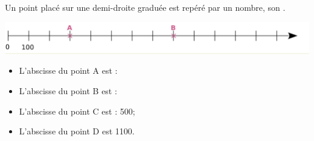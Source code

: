 \documentclass[xcolor={dvipsnames}]{beamer}
\begin{document}
\begin{frame}
	\begin{myprop}
		Un point placé sur une demi-droite graduée est repéré par un nombre, son .
	\end{myprop}
	
	\begin{myex}
		\begin{center}
			\includegraphics[scale=0.4]{../img/axe}
		\end{center}
		
		\begin{itemize}
			\item L'abscisse du point A est :
			\item L'abscisse du point B est :
			\item L'abscisse du point C est : 500;
			\item L'abscisse du point D est \num{1100}.
		\end{itemize}
	\end{myex}
\end{frame}
\end{document}
